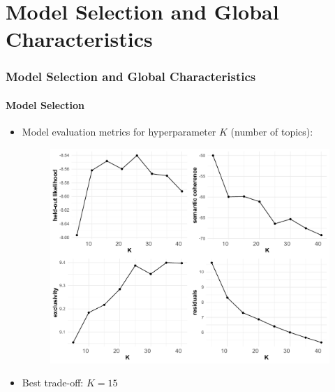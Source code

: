\documentclass[xcolor=dvipsnames]{beamer}
\begin{document}
\section{Model Selection and Global Characteristics}
\begin{frame}
\frametitle{Model Selection and Global Characteristics}
\framesubtitle{Model Selection}
\begin{itemize}
\item Model evaluation metrics for hyperparameter $K$ (number of topics):
	\begin{figure}[h!]
  	\centering
  	\includegraphics[scale = 0.30]{../plots/4_1/searchK.pdf}
	\end{figure}
\item Best trade-off: $K=15$
\end{itemize}
\end{frame}
\end{document}

